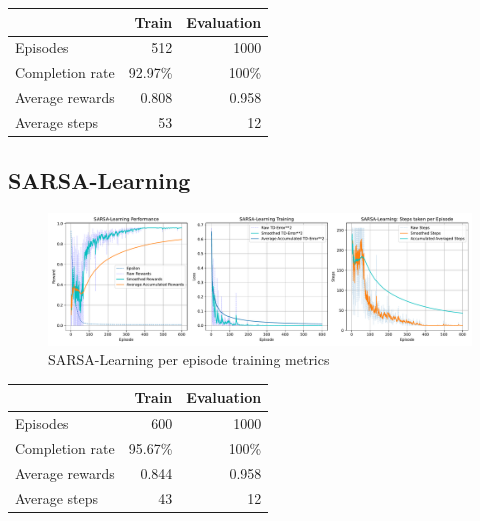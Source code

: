 \begin{table}
	\centering
	\begin{tabular}{@{}lrr@{}}
		\cmidrule(l){2-3}
		& Train & Evaluation \\ \midrule
		Episodes        &  512      &  1000          \\
		Completion rate &   92.97\%    &  100\%           \\
		Average rewards &   0.808    &    0.958        \\
		Average steps   &    53   &     12       \\ \bottomrule
	\end{tabular}
\end{table}

\subsection{SARSA-Learning}
\begin{figure}[H]
	\centering
	\includegraphics[width=\linewidth]{figures/SARSALearning_episode.pdf}
	\caption{SARSA-Learning per episode training metrics}
\end{figure}
\begin{table}
	\centering
	\begin{tabular}{@{}lrr@{}}
		\cmidrule(l){2-3}
		& Train & Evaluation \\ \midrule
		Episodes        &  600      &  1000          \\
		Completion rate &   95.67\%    &  100\%           \\
		Average rewards &   0.844    &    0.958        \\
		Average steps   &    43   &     12       \\ \bottomrule
	\end{tabular}
\end{table}


